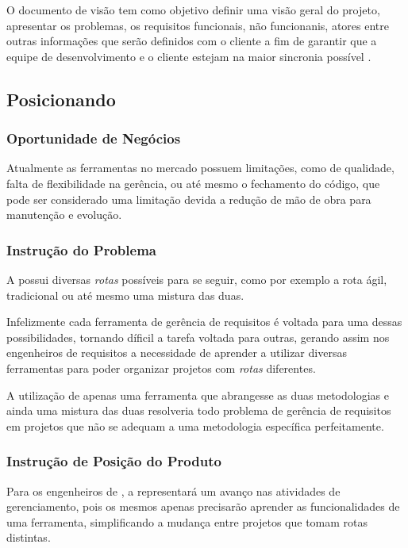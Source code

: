 
O documento de visão tem como objetivo definir uma visão geral do projeto, apresentar os problemas, os requisitos funcionais, não funcionanis, atores entre outras informações que serão definidos com o cliente a fim de garantir que a equipe de desenvolvimento e o cliente estejam na maior sincronia possível \cite{IBM:2014:Online}.

\subsection{Posicionando}
\subsubsection{Oportunidade de Negócios}

Atualmente as ferramentas no mercado possuem limitações, como de qualidade, falta de flexibilidade na gerência, ou até mesmo o fechamento do código, que pode ser considerado uma limitação devida a redução de mão de obra para manutenção e evolução.

\subsubsection{Instrução do Problema}

A \er{} possui diversas \textit{rotas} possíveis para se seguir, como por exemplo a rota ágil, tradicional ou até mesmo uma mistura das duas.

Infelizmente cada ferramenta de gerência de requisitos é voltada para uma dessas possibilidades, tornando díficil a tarefa voltada para outras, gerando assim nos engenheiros de requisitos a necessidade de aprender a utilizar diversas ferramentas para poder organizar projetos com \textit{rotas} diferentes.

A utilização de apenas uma ferramenta que abrangesse as duas metodologias e ainda uma mistura das duas resolveria todo problema de gerência de requisitos em projetos que não se adequam a uma metodologia específica perfeitamente.

\subsubsection{Instrução de Posição do Produto}

Para os engenheiros de \er, a \nomeferramenta representará um avanço nas atividades de gerenciamento, pois os mesmos apenas precisarão aprender as funcionalidades de uma ferramenta, simplificando a mudança entre projetos que tomam rotas distintas.

